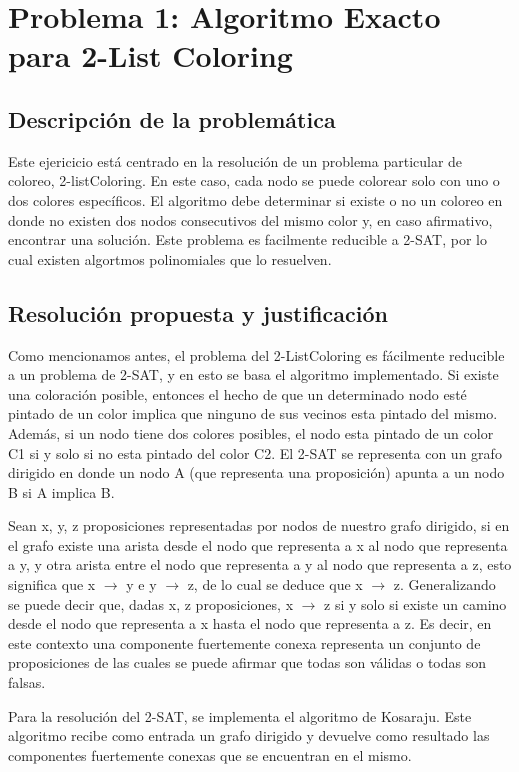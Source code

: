 \newpage
\section{Problema 1: Algoritmo Exacto para 2-List Coloring}

\subsection{Descripción de la problemática}
Este ejericicio está centrado en la resolución de un problema particular de coloreo, 2-listColoring. En este caso, cada nodo se puede colorear solo con uno o dos colores específicos. El algoritmo debe determinar si existe o no un coloreo en donde no existen dos nodos consecutivos del mismo color y, en caso afirmativo, encontrar una solución.
Este problema es facilmente reducible a 2-SAT, por lo cual existen algortmos polinomiales que lo resuelven.

\subsection{Resolución propuesta y justificación}
Como mencionamos antes, el problema del 2-ListColoring es fácilmente reducible a un problema de 2-SAT, y en esto se basa el algoritmo implementado. Si existe una coloración posible, entonces el hecho de que un determinado nodo esté pintado de un color implica que ninguno de sus vecinos esta pintado del mismo. Además, si un nodo tiene dos colores posibles, el nodo esta pintado de un color C1 si y solo si no esta pintado del color C2.
El 2-SAT se representa con un grafo dirigido en donde un nodo A (que representa una proposición) apunta a un nodo B si A implica B.

Sean x, y, z proposiciones representadas por nodos de nuestro grafo dirigido, si en el grafo existe una arista desde el nodo que representa a x al nodo que representa a y, y otra arista entre el nodo que representa a y al nodo que representa a z, esto significa que x $\rightarrow$ y e y $\rightarrow$ z, de lo cual se deduce que x $\rightarrow$ z. Generalizando se puede decir que, dadas x, z proposiciones,  x $\rightarrow$ z si y solo si existe un camino desde el nodo que representa a x hasta el nodo que representa a z. Es decir, en este contexto una componente fuertemente conexa representa un conjunto de proposiciones de las cuales se puede afirmar que todas son válidas o todas son falsas. 

Para la resolución del 2-SAT, se implementa el algoritmo de Kosaraju. Este algoritmo recibe como entrada un grafo dirigido y devuelve como resultado las componentes fuertemente conexas que se encuentran en el mismo. 

